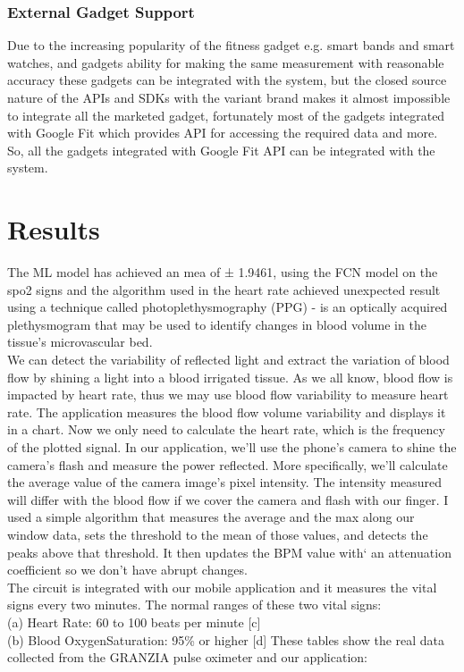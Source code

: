 \documentclass{bmcart}
\begin{document}
\subsubsection*{External Gadget Support}
Due to the increasing popularity of the fitness gadget e.g. smart bands and
smart watches, and gadgets ability for making the same measurement with
reasonable accuracy these gadgets can be integrated with the system, but the
closed source nature of the APIs and SDKs with the variant  brand makes it
almost impossible to integrate all the marketed gadget, fortunately most of the
gadgets integrated with Google Fit which provides API for accessing the required
data and more. So, all the gadgets integrated with Google Fit API can be
integrated with the system.

\section*{Results}
The ML model has achieved an mea of ± 1.9461, using the FCN model on the spo2
signs and the algorithm used in the heart rate achieved unexpected result using
a technique called photoplethysmography (PPG) - is an optically acquired
plethysmogram that may be used to identify changes in blood volume in the
tissue's microvascular bed.\\
We can detect the variability of reflected light and extract the variation of
blood flow by shining a light into a blood irrigated tissue. As we all know,
blood flow is impacted by heart rate, thus we may use blood flow variability to
measure heart rate. The application measures the blood flow volume variability
and displays it in a chart. Now we only need to calculate the heart rate, which
is the frequency of the plotted signal. In our application, we'll use the
phone's camera to shine the camera's flash and measure the power reflected. More
specifically, we'll calculate the average value of the camera image's pixel
intensity. The intensity measured will differ with the blood flow if we cover
the camera and flash with our finger. I used a simple algorithm that measures
the average and the max along our window data, sets the threshold to the mean of
those values, and detects the peaks above that threshold. It then updates the
BPM value with` an attenuation coefficient so we don’t have abrupt changes.\\
The circuit is integrated with our mobile application and it measures the vital
signs every two minutes. The normal ranges of these two vital signs: \\(a) Heart
Rate: 60 to 100 beats per minute [c] \\(b) Blood OxygenSaturation: 95\% or
higher [d] These tables show the real data collected from the GRANZIA pulse
oximeter and our application:
\end{document}
